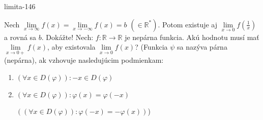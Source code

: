 \begin{defproblem}{limita-146}
\begin{tasks}
\task Nech $\lim\limits_{x \rightarrow \infty} f(x)=\lim\limits_{x \rightarrow -\infty} f(x)=b$  $(\in \mathbb{R^*})$. Potom existuje aj $\lim\limits_{x \rightarrow 0} f(\frac{1}{x})$  a rovná sa $b$. Dokážte!
\task Nech: $f: \mathbb{R} \rightarrow \mathbb{R}$ je nepárna funkcia. Akú hodnotu musí mať $\lim\limits_{x \rightarrow 0+} f(x)$, aby existovala $\lim\limits_{x \rightarrow 0} f(x)$? (Funkcia $\psi$ sa nazýva párna (nepárna), ak vzhovuje nasledujúcim podmienkam:
\begin{enumerate}
\item $(\forall x \in D(\varphi)): -x \in D(\varphi)$
\item
    $(\forall x \in D(\varphi)): \varphi(x)=\varphi(-x)$

    $((\forall x \in D(\varphi)): \varphi(-x)=-\varphi(x))$)
\end{enumerate}
\end{tasks}
\end{defproblem}

